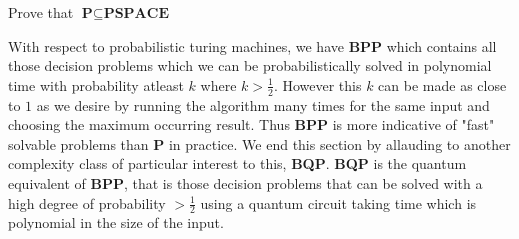 \begin{exercise}
Prove that $\textbf{P} \subseteq \textbf{PSPACE}$
\end{exercise}
With respect to probabilistic turing machines, we have \textbf{BPP} which contains all those decision problems which we can be probabilistically solved in polynomial time with probability atleast $k$ where $k > \frac{1}{2}$. However this $k$ can be made as close to $1$ as we desire by running the algorithm many times for the same input and choosing the maximum occurring result. Thus \textbf{BPP} is more indicative of "fast" solvable problems than \textbf{P} in practice.
We end this section by allauding to another complexity class of particular interest to this, \textbf{BQP}. \textbf{BQP} is the quantum equivalent of \textbf{BPP}, that is those decision problems that can be solved with a high degree of probability $ > \frac{1}{2}$ using a quantum circuit taking time which is polynomial in the size of the input.

\clearpage